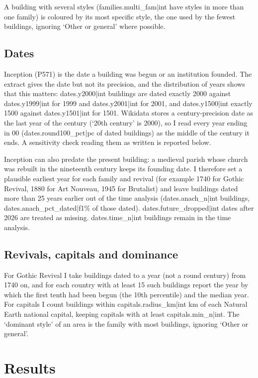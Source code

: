 \documentclass[11pt,a4paper]{article}
\begin{document}
A building with several styles ({{families.multi_fam|int}} have styles in more than one family) is coloured by its most specific style, the one used by the fewest buildings, ignoring `Other or general' where possible.

\subsection{Dates}
Inception (P571) is the date a building was begun or an institution founded. The extract gives the date but not its precision, and the distribution of years shows that this matters: {{dates.y2000|int}} buildings are dated exactly 2000 against {{dates.y1999|int}} for 1999 and {{dates.y2001|int}} for 2001, and {{dates.y1500|int}} exactly 1500 against {{dates.y1501|int}} for 1501. Wikidata stores a century-precision date as the last year of the century (`20th century' is 2000), so I read every year ending in 00 ({{dates.round100_pct|pc}} of dated buildings) as the middle of the century it ends. A sensitivity check reading them as written is reported below.

Inception can also predate the present building: a medieval parish whose church was rebuilt in the nineteenth century keeps its founding date. I therefore set a plausible earliest year for each family and revival (for example 1740 for Gothic Revival, 1880 for Art Nouveau, 1945 for Brutalist) and leave buildings dated more than 25 years earlier out of the time analysis ({{dates.anach_n|int}} buildings, {{dates.anach_pct_dated|f1}}\% of those dated). {{dates.future_dropped|int}} dates after 2026 are treated as missing. {{dates.time_n|int}} buildings remain in the time analysis.

\subsection{Revivals, capitals and dominance}
For Gothic Revival I take buildings dated to a year (not a round century) from 1740 on, and for each country with at least 15 such buildings report the year by which the first tenth had been begun (the 10th percentile) and the median year. For capitals I count buildings within {{capitals.radius_km|int}} km of each Natural Earth national capital, keeping capitals with at least {{capitals.min_n|int}}. The `dominant style' of an area is the family with most buildings, ignoring `Other or general'.

\section{Results}
\end{document}
